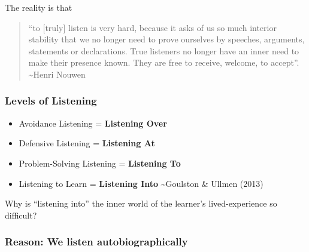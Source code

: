 \documentclass[
]{book}
\providecommand{\tightlist}{%
  \setlength{\itemsep}{0pt}\setlength{\parskip}{0pt}}
\begin{document}
The reality is that

\begin{quote}
``to {[}truly{]} listen is very hard, because it asks of us so much interior stability that we no longer need to prove ourselves by speeches, arguments, statements or declarations. True listeners no longer have an inner need to make their presence known. They are free to receive, welcome, to accept''.
\textasciitilde Henri Nouwen
\end{quote}

\hypertarget{levels-of-listening}{%
\subsubsection*{Levels of Listening}\label{levels-of-listening}}

\begin{itemize}
\tightlist
\item
  Avoidance Listening = \textbf{Listening Over}
\item
  Defensive Listening = \textbf{Listening At}
\item
  Problem-Solving Listening = \textbf{Listening To}
\item
  Listening to Learn = \textbf{Listening Into}
  \textasciitilde Goulston \& Ullmen (2013)
\end{itemize}

\begin{reflect}
Why is ``listening into'' the inner world of the learner's lived-experience so difficult?
\end{reflect}

\hypertarget{reason-we-listen-autobiographically}{%
\subsubsection*{Reason: We listen autobiographically}\label{reason-we-listen-autobiographically}}
\end{document}
